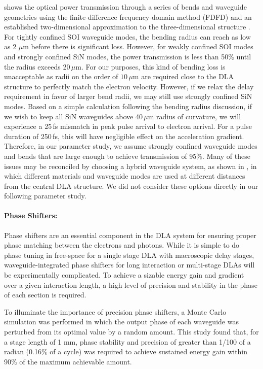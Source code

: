  shows the optical power transmission through a series of bends and waveguide geometries using the finite-difference frequency-domain method (FDFD) \cite{shin2012choice} and an established two-dimensional approximation to the three-dimensional structure \cite{smotrova2005cold}.
For tightly confined SOI waveguide modes, the bending radius can reach as low as 2 $\mu$m before there is significant loss.
However, for weakly confined SOI modes and strongly confined SiN modes, the power transmission is less than 50$\%$ until the radius exceeds 20\,$\mu$m.
For our purposes, this kind of bending loss is unacceptable as radii on the order of $10$\,$\mu$m are required close to the DLA structure to perfectly match the electron velocity.
However, if we relax the delay requirement in favor of larger bend radii, we may still use strongly confined SiN modes.
Based on a simple calculation following the bending radius discussion, if we wish to keep all SiN waveguides above 40\,$\mu$m radius of curvature, we will experience a 25\,fs mismatch in peak pulse arrival to electron arrival.
For a pulse duration of 250\,fs, this will have negligible effect on the acceleration gradient.
Therefore, in our parameter study, we assume strongly confined waveguide modes and bends that are large enough to achieve transmission of 95\%.
Many of these issues may be reconciled by choosing a hybrid waveguide system, as shown in , in which different materials and waveguide modes are used at different distances from the central DLA structure.
We did not consider these options directly in our following parameter study.

\paragraph{Phase Shifters:}

Phase shifters are an essential component in the DLA system for ensuring proper phase matching between the electrons and photons.
While it is simple to do phase tuning in free-space for a single stage DLA with macroscopic delay stages, waveguide-integrated phase shifters for long interaction or multi-stage DLAs will be experimentally complicated.
To achieve a sizable energy gain and gradient over a given interaction length, a high level of precision and stability in the phase of each section is required.

To illuminate the importance of precision phase shifters, a Monte Carlo simulation was performed in which the output phase of each waveguide was perturbed from its optimal value by a random amount.
This study found that, for a stage length of 1 mm, phase stability and precision of greater than 1/100 of a radian (0.16\% of a cycle) was required to achieve sustained energy gain within 90\% of the maximum achievable amount.

